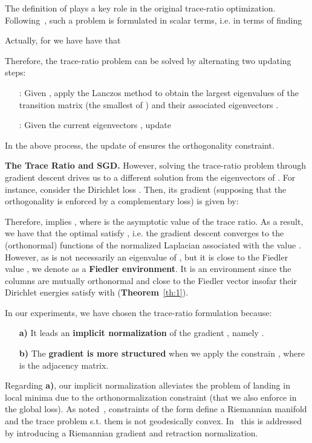 \documentclass{article}
\theoremstyle{plain}
\theoremstyle{definition}
\begin{document}
The definition of  plays a key role in the original trace-ratio optimization. Following~\citep{TraceRatio12}, such a problem is formulated in scalar terms, i.e. in terms of finding

Actually, for  we have have that 

Therefore, the trace-ratio problem can be solved by alternating two updating steps:
\begin{itemize}
\item[] : Given , apply the Lanczos method to obtain the  largest eigenvalues of the transition matrix  (the smallest of ) and their associated eigenvectors .
\item[] :  Given the current eigenvectors ,  update \:
\end{itemize}
In the above process, the update of  ensures the orthogonality constraint. 
 
\textbf{The Trace Ratio and SGD.} 
However, solving the trace-ratio problem through gradient descent drives us to a different solution from the eigenvectors of . For instance, consider the Dirichlet loss . Then, its gradient (supposing that the orthogonality is enforced by a complementary loss) is given by: 

Therefore,  implies , where  is the asymptotic value of the trace ratio. As a result, we have that the optimal  satisfy , i.e. the gradient descent converges to the (orthonormal) functions of  the normalized Laplacian  associated with the value . However, as  is not necessarily an eigenvalue of , but it is close to the Fiedler value , we denote  as a \textbf{Fiedler environment}. It is an environment since the  columns  are mutually orthonormal and close to the Fiedler vector  insofar their Dirichlet energies  satisfy  with  (\textbf{Theorem}~\ref{th:1}).

In our experiments, we have chosen the trace-ratio formulation because:
\begin{itemize}
    \item [\textbf{a)}] It leads an \textbf{implicit normalization} of the gradient , namely .  
\item [\textbf{b)}] The \textbf{gradient is more structured} when we apply the constrain , where  is the adjacency matrix. 
\end{itemize}

Regarding \textbf{a)}, our implicit normalization alleviates the problem of landing in local minima due to the orthonormalization constraint (that we also enforce in the global loss). As noted~\citep{SGDSIAM99},  constraints of the form  define a Riemannian manifold and the trace problem s.t. them is not geodesically convex. In~\citep{SGDeigen18} this is addressed by introducing a Riemannian gradient and retraction normalization. 
\end{document}
